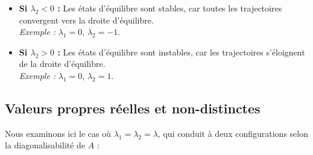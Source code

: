             \begin{itemize}
                \item \textbf{Si $\lambda_2 < 0$ :} Les états d'équilibre sont stables, car toutes les trajectoires convergent vers la droite d'équilibre. \\
                \textit{Exemple :} $\lambda_1 = 0$, $\lambda_2 = -1$.
                
                \item \textbf{Si $\lambda_2 > 0$ :} Les états d'équilibre sont instables, car les trajectoires s'éloignent de la droite d'équilibre. \\
                \textit{Exemple :} $\lambda_1 = 0$, $\lambda_2 = 1$.
            \end{itemize}

        \subsection{Valeurs propres réelles et non-distinctes}
            Nous examinons ici le cas où $\lambda_1 = \lambda_2 = \lambda$, qui conduit à deux configurations selon la diagonalisabilité de $A$ :

